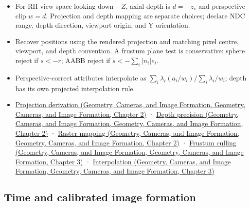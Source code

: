\begin{itemize}
\tightlist
\item
  For RH view space looking down \(-Z\), axial depth is \(d=-z_v\) and perspective clip \(w=d\). Projection and depth mapping are separate choices; declare NDC range, depth direction, viewport origin, and Y orientation.
\item
  Recover positions using the rendered projection and matching pixel centre, viewport, and depth convention. A frustum plane test is conservative: sphere reject if \(s<-r\); AABB reject if \(s<-\sum_i|n_i|e_i\).
\item
  Perspective-correct attributes interpolate as \(\sum_i\lambda_i(a_i/w_i)/\sum_i\lambda_i/w_i\); depth has its own projected interpolation rule.
\item
  \href{../03-Geometry-Cameras-and-Image-Formation/main.pdf\#nameddest=02-foundations-ii-ch033-projection-turns-rays-into-clip-coordinates}{Projection derivation (Geometry, Cameras, and Image Formation, Geometry, Cameras, and Image Formation, Chapter 2)} · \href{../03-Geometry-Cameras-and-Image-Formation/main.pdf\#nameddest=02-foundations-ii-ch033-depth-is-a-numerical-design-choice}{Depth precision (Geometry, Cameras, and Image Formation, Geometry, Cameras, and Image Formation, Chapter 2)} · \href{../03-Geometry-Cameras-and-Image-Formation/main.pdf\#nameddest=02-foundations-ii-ch033-a-projected-point-still-needs-a-raster-convention}{Raster mapping (Geometry, Cameras, and Image Formation, Geometry, Cameras, and Image Formation, Chapter 2)} · \href{../03-Geometry-Cameras-and-Image-Formation/main.pdf\#nameddest=02-foundations-ii-ch034-the-viewing-volume-is-six-half-spaces}{Frustum culling (Geometry, Cameras, and Image Formation, Geometry, Cameras, and Image Formation, Chapter 3)} · \href{../03-Geometry-Cameras-and-Image-Formation/main.pdf\#nameddest=02-foundations-ii-ch034-raster-interpolation-remembers-homogeneous-depth}{Interpolation (Geometry, Cameras, and Image Formation, Geometry, Cameras, and Image Formation, Chapter 3)}
\end{itemize}

\subsection{Time and calibrated image formation}\label{appendix-a2b71a18f5a2-time-and-calibrated-image-formation}


